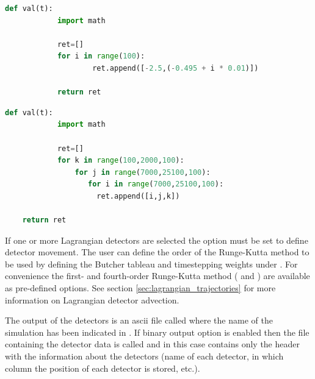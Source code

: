\begin{example}
  \begin{lstlisting}[language=Python]
def val(t):
            import math

            ret=[]
            for i in range(100):
                    ret.append([-2.5,(-0.495 + i * 0.01)])

            return ret
  \end{lstlisting}
  \caption{A Python function setting 100 detectors. This
  example illustrates that it is possible to use a Python function to set an array of detectors.}
  \label{examp:python_function_detectors}
\end{example}

\begin{example}
  \begin{lstlisting}[language=Python]
def val(t):
            import math

            ret=[]
            for k in range(100,2000,100):
                for j in range(7000,25100,100):
	               for i in range(7000,25100,100):
		             ret.append([i,j,k])

	return ret
  \end{lstlisting}
  \caption{A Python function setting 622459 detectors uniformly distributed
    at intervals of 100 m in the three orthogonal directions. They cover 19 z planes, from z=100 to z=1900, with 32761 detectors in each plane, from
    x=7000 to x=25000 and y=7000 to y=25000.}
  \label{examp:python_function_detectors_1}
\end{example}

If one or more Lagrangian detectors are selected the option  must be set to define detector movement.
The user can define the order of the Runge-Kutta method to be used by defining the Butcher tableau and timestepping weights under .
For convenience the first- and fourth-order Runge-Kutta method ( and ) are available as pre-defined options.
See section \ref{sec:lagrangian_trajectories} for more information on Lagrangian detector advection.

The output of the detectors is an ascii file called
 where the name of the simulation has
been indicated in . If binary output
  option is enabled then the file containing the detector data is called
 and in this case  contains only the header with the
information about the detectors (name of each detector, in which column the
position of each detector is stored, etc.).

